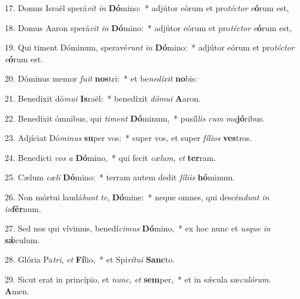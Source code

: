 17. Domus Israël sperá\textit{vit} \textit{in} \textbf{Dó}mino:~*  adjútor eórum et pro\textit{téc}\textit{tor} \textit{e}\textbf{ó}rum est,\

18. Domus Aaron sperá\textit{vit} \textit{in} \textbf{Dó}mino:~*  adjútor eórum et pro\textit{téc}\textit{tor} \textit{e}\textbf{ó}rum est,\

19. Qui timent Dóminum, speravé\textit{runt} \textit{in} \textbf{Dó}mino:~*  adjútor eórum et pro\textit{téc}\textit{tor} \textit{e}\textbf{ó}rum est.\

20. Dóminus memor \textit{fu}\textit{it} \textbf{nos}tri:~*  et be\textit{ne}\textit{dí}\textit{xit} \textbf{no}bis:\

21. Benedíxit dó\textit{mu}\textit{i} \textbf{Is}raël:~*  benedíxit \textit{dó}\textit{mu}\textit{i} \textbf{A}aron.\

22. Benedíxit ómnibus, qui \textit{ti}\textit{ment} \textbf{Dó}minum,~*  pusíl\textit{lis} \textit{cum} \textit{ma}\textbf{jó}ribus.\

23. Adjíciat Dó\textit{mi}\textit{nus} \textbf{su}per vos:~*  super vos, et super \textit{fí}\textit{li}\textit{os} \textbf{ves}tros.\

24. Benedícti \textit{vos} \textit{a} \textbf{Dó}mino,~*  qui fecit \textit{cæ}\textit{lum}, \textit{et} \textbf{ter}ram.\

25. Cælum \textit{cæ}\textit{li} \textbf{Dó}mino:~*  terram autem dedit \textit{fí}\textit{li}\textit{is} \textbf{hó}minum.\

26. Non mórtui laudá\textit{bunt} \textit{te}, \textbf{Dó}mine:~*  neque omnes, qui descén\textit{dunt} \textit{in} \textit{in}\textbf{fér}num.\

27. Sed nos qui vívimus, benedí\textit{ci}\textit{mus} \textbf{Dó}mino,~*  ex hoc nunc et \textit{us}\textit{que} \textit{in} \textbf{sǽ}culum.\

28. Glória Pa\textit{tri}, \textit{et} \textbf{Fí}lio,~*  et Spi\textit{rí}\textit{tu}\textit{i} \textbf{Sanc}to.\

29. Sicut erat in princípio, et \textit{nunc}, \textit{et} \textbf{sem}per,~*  et in sǽcula sæ\textit{cu}\textit{ló}\textit{rum}. \textbf{A}men.\


